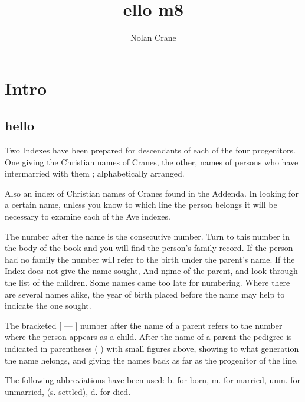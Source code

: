 \documentclass{book}
\begin{document}
\title{ello m8}
\author{Nolan Crane}

\maketitle
\tableofcontents

\chapter{Intro}


\section{hello}


Two Indexes have been prepared for descendants of each of the 
four progenitors. One giving the Christian names of Cranes, the other, 
names of persons who have intermarried with them ; alphabetically 
arranged. 

Also an index of Christian names of Cranes found in the Addenda. 
In looking for a certain name, unless you know to which line the 
person belongs it will be necessary to examine each of the Ave indexes. 

The number after the name is the consecutive number. Turn to this 
number in the body of the book and you will find the person's family 
record. If the person had no family the number will refer to the birth 
under the parent's name. If the Index does not give the name sought, 
And n;ime of the parent, and look through the list of the children. 
Some names came too late for numbering. Where there are several 
names alike, the year of birth placed before the name may help to 
indicate the one sought. 

The bracketed [ — ] number after the name of a parent refers to the 
number where the person appears as a child. After the name of a parent the pedigree is indicated in parentheses ( ) with small figures above, showing to what generation the name helongs, and giving the names back as far as the progenitor of the line. 

The following abbreviations have been used: b. for born, m. for 
married, unm. for unmarried, (s. settled), d. for died. 
\end{document}
